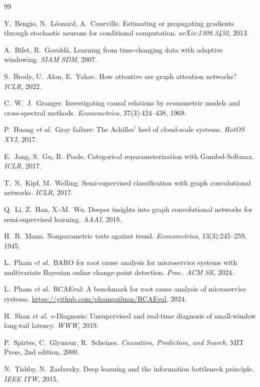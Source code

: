 \documentclass[11pt,a4paper]{article}
\begin{document}
\begin{thebibliography}{99}
\small

Y.~Bengio, N.~L\'eonard, A.~Courville. Estimating or propagating gradients
through stochastic neurons for conditional computation. \emph{arXiv:1308.3432},
2013.

A.~Bifet, R.~Gavald\`a. Learning from time-changing data with adaptive
windowing. \emph{SIAM SDM}, 2007.

S.~Brody, U.~Alon, E.~Yahav. How attentive are graph attention networks?
\emph{ICLR}, 2022.

C.~W.~J.~Granger. Investigating causal relations by econometric models and
cross-spectral methods. \emph{Econometrica}, 37(3):424--438, 1969.

P.~Huang \emph{et al.}\ Gray failure: The Achilles' heel of cloud-scale
systems. \emph{HotOS XVI}, 2017.

E.~Jang, S.~Gu, B.~Poole. Categorical reparameterization with Gumbel-Softmax.
\emph{ICLR}, 2017.

T.~N.~Kipf, M.~Welling. Semi-supervised classification with graph
convolutional networks. \emph{ICLR}, 2017.

Q.~Li, Z.~Han, X.-M.~Wu. Deeper insights into graph convolutional networks
for semi-supervised learning. \emph{AAAI}, 2018.

H.~B.~Mann. Nonparametric tests against trend. \emph{Econometrica},
13(3):245--259, 1945.

L.~Pham \emph{et al.}\ BARO for root cause analysis for microservice
systems with multivariate Bayesian online change-point detection.
\emph{Proc.\ ACM SE}, 2024.

L.~Pham \emph{et al.}\ RCAEval: A benchmark for root cause analysis of
microservice systems. \url{https://github.com/phamquiluan/RCAEval}, 2024.

H.~Shan \emph{et al.}\ $\epsilon$-Diagnosis: Unsupervised and real-time
diagnosis of small-window long-tail latency. \emph{WWW}, 2019.

P.~Spirtes, C.~Glymour, R.~Scheines. \emph{Causation, Prediction, and
Search}. MIT Press, 2nd edition, 2000.

N.~Tishby, N.~Zaslavsky. Deep learning and the information bottleneck
principle. \emph{IEEE ITW}, 2015.


\end{thebibliography}
\end{document}

